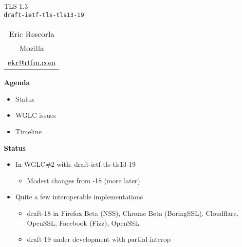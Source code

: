 \documentclass[helvetica]{seminar}
\newcommand{\heading}[1]{%
  \begin{center} 
    \large\bf 
    #1 
  \end{center} 
  \vspace{.4 in}}
\begin{document}
\begin{slide}
\begin{center}
\vspace{.5 in}
\LARGE{{\bf}TLS 1.3\\{\small \verb^draft-ietf-tls-tls13-19^}}\\
\vspace{.2in}
\large{
\begin{tabular}{c}
Eric Rescorla\\
Mozilla\\
\url{ekr@rtfm.com}
\end{tabular}
}
\end{center}
\end{slide}

\centerslidesfalse 

\begin{slide}
\heading{Agenda}

\begin{itemize}
\item Status
\item WGLC issues
\item Timeline
\end{itemize}

\end{slide}


\begin{slide}
\heading{Status}

\begin{itemize}
\item In WGLC\#2 with: draft-ietf-tls-tls13-19
  \begin{itemize}
  \item Modest changes from -18 (more later)
  \end{itemize}
\item Quite a few interoperable implementations
  \begin{itemize}
  \item draft-18 in Firefox Beta (NSS), Chrome Beta (BoringSSL), Cloudflare, OpenSSL, Facebook (Fizz), OpenSSL
  \item draft-19 under development with partial interop
  \end{itemize}
\end{itemize}
\end{slide}
\end{document}
